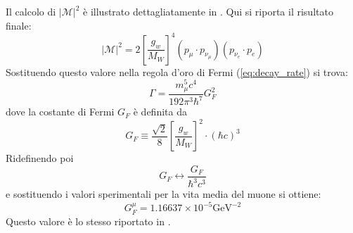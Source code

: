\documentclass{subnucbo}
\begin{document}
Il calcolo di $| \mathcal { M } | ^ { 2 }$ è illustrato dettagliatamente in \cite{ref:hayes}. Qui si riporta il risultato finale:
\begin{equation}
         | \mathcal { M } | ^ { 2 }  = 2 \left[ \frac { g _ { w } } { M _ { W } } \right] ^ { 4 } \left( p _ { \mu } \cdot p _ { \nu _ { \mu } } \right) \left( p _ { \nu _ { e } } \cdot p _ { e } \right)
\end{equation}
Sostituendo questo valore nella regola d'oro di Fermi (\ref{eq:decay_rate}) si trova:
\begin{equation}
        \Gamma = \frac { m _ { \mu } ^ { 5 } c ^ { 4 } } { 192 \pi ^ { 3 } \hbar ^ { 7 } } G _ { F } ^ { 2 }
        \label{eq:muon_decay_rate}
\end{equation}
dove la costante di Fermi $G_{F}$ è definita da
\begin{equation}
        G _ { F } \equiv \frac { \sqrt { 2 } } { 8 } \left[ \frac { g _ { w } } { M _ { W } } \right] ^ { 2 } \cdot ( \hbar c ) ^ { 3 }
        \label{eq:fermi_constant}
\end{equation}
Ridefinendo poi
\begin{equation}
        G_{F} \leftrightarrow \frac{G_{F}}{\hbar^{3}c^{3}}
        \label{eq:fermi_constant_ridef}
\end{equation}
e sostituendo i valori sperimentali per la vita media del muone si ottiene:
\begin{equation}
        G^{\mu} _ { F } = 1.16637 \times 10 ^ { - 5 } \mathrm { GeV } ^ { - 2 }
        \label{eq:gf_muon_value}
\end{equation}
Questo valore è lo stesso riportato in \cite{ref:PDG}.
\end{document}
